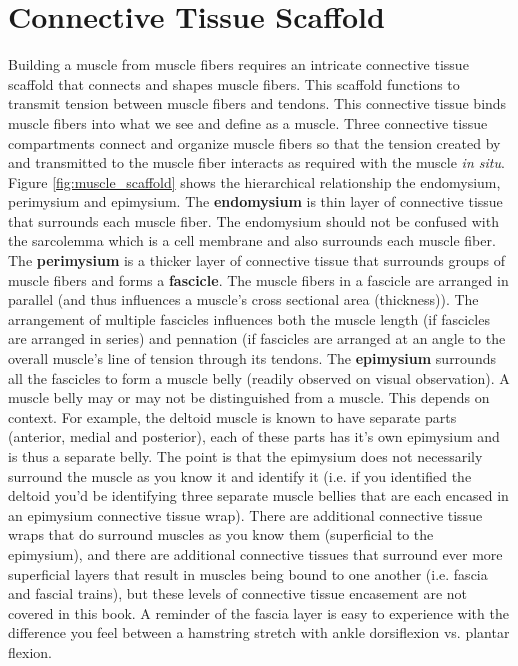 \section{Connective Tissue Scaffold}

Building a muscle from muscle fibers requires an intricate connective tissue scaffold that connects and shapes muscle fibers. This scaffold functions to transmit tension between muscle fibers and tendons.  This connective tissue binds muscle fibers into what we see and define as a muscle. Three connective tissue compartments connect and organize muscle fibers so that the tension created by and transmitted to the muscle fiber interacts as required with the muscle \textit{in situ}. Figure \ref{fig:muscle_scaffold} shows the hierarchical relationship the endomysium, perimysium and epimysium. The \textbf{endomysium} is thin layer of connective tissue that surrounds each muscle fiber. The endomysium should not be confused with the sarcolemma which is a cell membrane and also surrounds each muscle fiber. The \textbf{perimysium} is a thicker layer of connective tissue that surrounds groups of muscle fibers and forms a \textbf{fascicle}. The muscle fibers in a fascicle are arranged in parallel (and thus influences a muscle's cross sectional area (thickness)). The arrangement of multiple fascicles influences both the muscle length (if fascicles are arranged in series) and pennation (if fascicles are arranged at an angle to the overall muscle's line of tension through its tendons. The \textbf{epimysium} surrounds all the fascicles to form a muscle belly (readily observed on visual observation). A muscle belly may or may not be distinguished from a muscle. This depends on context. For example, the deltoid muscle is known to have separate parts (anterior, medial and posterior), each of these parts has it's own epimysium and is thus a separate belly. The point is that the epimysium does not necessarily surround the muscle as you know it and identify it (i.e. if you identified the deltoid you'd be identifying three separate muscle bellies that are each encased in an epimysium connective tissue wrap). There are additional connective tissue wraps that do surround muscles as you know them (superficial to the epimysium), and there are additional connective tissues that surround ever more superficial layers that result in muscles being bound to one another (i.e. fascia and fascial trains), but these levels of connective tissue encasement are not covered in this book. A reminder of the fascia layer is easy to experience with the difference you feel between a hamstring stretch with ankle dorsiflexion vs. plantar flexion.

